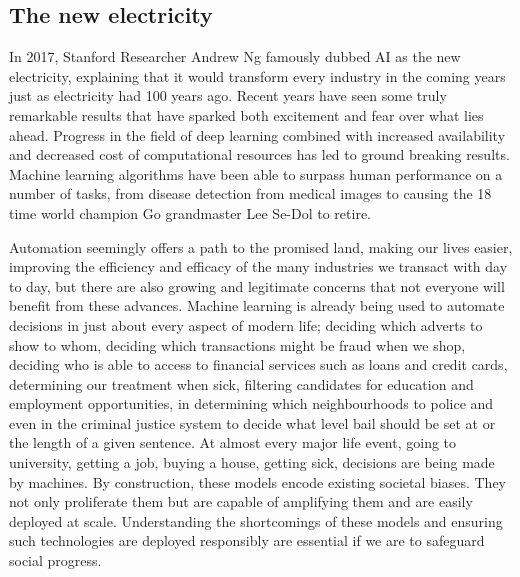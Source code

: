 \subsection{The new electricity}

In 2017, Stanford Researcher Andrew Ng famously dubbed AI as the new electricity, explaining that it would transform every industry in the coming years just as electricity had 100 years ago. Recent years have seen some truly remarkable results that have sparked both excitement and fear over what lies ahead. Progress in the field of deep learning combined with increased availability and decreased cost of computational resources has led to ground breaking results. Machine learning algorithms have been able to surpass human performance on a number of tasks, from disease detection from medical images to causing the 18 time world champion Go grandmaster Lee Se-Dol to retire.

Automation seemingly offers a path to the promised land, making our lives easier, improving the efficiency and efficacy of the many industries we transact with day to day, but there are also growing and legitimate concerns that not everyone will benefit from these advances. Machine learning is already being used to automate decisions in just about every aspect of modern life; deciding which adverts to show to whom, deciding which transactions might be fraud when we shop, deciding who is able to access to financial services such as loans and credit cards, determining our treatment when sick, filtering candidates for education and employment opportunities, in determining which neighbourhoods to police and even in the criminal justice system to decide what level bail should be set at or the length of a given sentence. At almost every major life event, going to university, getting a job, buying a house, getting sick, decisions are being made by machines. By construction, these models encode existing societal biases. They not only proliferate them but are capable of amplifying them and are easily deployed at scale. Understanding the shortcomings of these models and ensuring such technologies are deployed responsibly are essential if we are to safeguard social progress.


